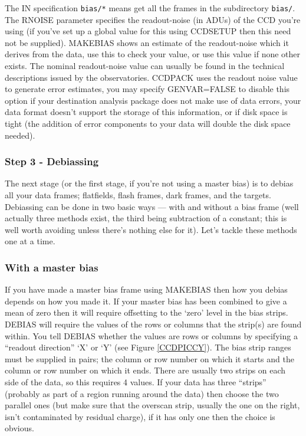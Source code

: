 \documentclass[twoside,11pt]{article}
\newcommand{\htmlref}[2]{#1}
\newcommand{\latexhtml}[2]{#1}
\newcommand{\xlabel}[1]{}
\renewcommand{\_}{\texttt{\symbol{95}}}
\newcommand{\ttsize}{\latexhtml{\small}{}}
\newcommand{\text}[1]{{\ttsize \tt #1}}
\newcommand{\routine}[1]{{\sc #1}}
\newcommand{\xroutine}[1]{\htmlref{{\sc #1}}{#1}}
\begin{document}
The IN specification \text{bias/*} means get all the frames
in the subdirectory \text{bias/}.
The RNOISE parameter specifies the readout-noise (in ADUs) of
the CCD you're using (if you've set up a global value for this using
\xroutine{CCDSETUP} then this need not be supplied).
\routine{MAKEBIAS} shows an estimate of the readout-noise which it derives from
the data, use this to check your value, or use this value if none
other exists.
The nominal readout-noise value can usually be found in the technical
descriptions issued by the observatories.
CCDPACK uses the readout noise value to generate error estimates, you
may specify GENVAR=FALSE to disable this option if your
destination analysis package does not make use of data errors, your
data format doesn't support the storage of this information, or if
disk space is tight (the addition of error components to your data
will double the disk space needed).

\subsubsection{\xlabel{debiassing}\label{debiassing}Step 3 - Debiassing}

The next stage (or the first stage, if you're not using a master bias)
is to debias all your data frames; flatfields, flash frames, dark
frames, and the targets.
Debiassing can be done in two basic ways --- with and without a bias
frame (well actually three methods exist, the third being subtraction
of a constant; this is well worth avoiding unless there's nothing else
for it).
Let's tackle these methods one at a time.

\subsubsection{\label{withbiasframes}With a master bias}

If you have made a master bias frame using \xroutine{MAKEBIAS} then how you
debias depends on how you made it.
If your master bias has been combined to give a mean of zero then it will
require offsetting to the `zero' level in the bias strips.
\xroutine{DEBIAS} will require the values of the rows or columns that the strip(s)
are found within.
You tell \routine{DEBIAS} whether the values are rows or columns by specifying a
``readout direction'' `X' or `Y' (see Figure \ref{CCDPICCY}).
The bias strip ranges must be supplied in pairs; the column or row
number on which it starts and the column or row number on which it ends.
There are usually two strips on each side of the data, so this
requires 4 values.
If your data has three ``strips'' (probably as part of a region
running around the data) then choose the two parallel ones (but make
sure that the overscan strip, usually the one on the right, isn't
contaminated by residual charge), if it has only one then the choice
is obvious.
\end{document}
